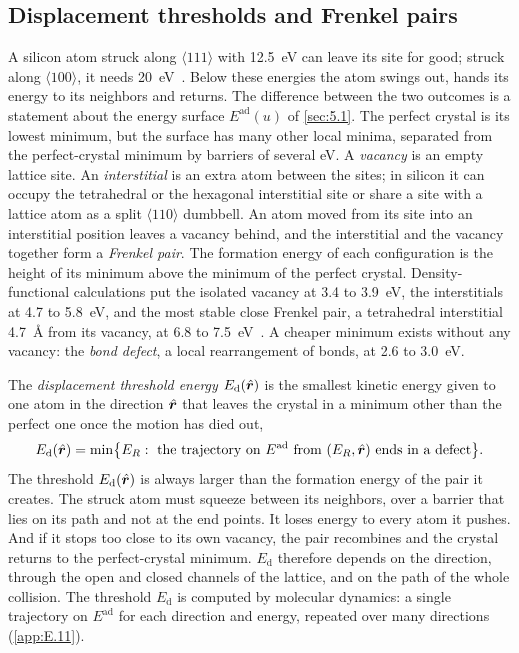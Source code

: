 \subsection{Displacement thresholds and Frenkel pairs}

A silicon atom struck along $\langle111\rangle$ with \SI{12.5}{eV} can leave its site for good; struck along $\langle100\rangle$, it needs \SI{20}{eV}~\cite[Table~IV]{holmstrom2008threshold}. Below these energies the atom swings out, hands its energy to its neighbors and returns. The difference between the two outcomes is a statement about the energy surface $E^{\mathrm{ad}}(u)$ of \cref{sec:5.1}. The perfect crystal is its lowest minimum, but the surface has many other local minima, separated from the perfect-crystal minimum by barriers of several eV. A \emph{vacancy} is an empty lattice site. An \emph{interstitial} is an extra atom between the sites; in silicon it can occupy the tetrahedral or the hexagonal interstitial site or share a site with a lattice atom as a split $\langle110\rangle$ dumbbell. An atom moved from its site into an interstitial position leaves a vacancy behind, and the interstitial and the vacancy together form a \emph{Frenkel pair}. The formation energy of each configuration is the height of its minimum above the minimum of the perfect crystal. Density-functional calculations put the isolated vacancy at 3.4 to \SI{3.9}{eV}, the interstitials at 4.7 to \SI{5.8}{eV}, and the most stable close Frenkel pair, a tetrahedral interstitial \SI{4.7}{\angstrom} from its vacancy, at 6.8 to \SI{7.5}{eV}~\cite[Table~III]{holmstrom2008threshold}. A cheaper minimum exists without any vacancy: the \emph{bond defect}, a local rearrangement of bonds, at 2.6 to \SI{3.0}{eV}.

The \emph{displacement threshold energy} $E_{\mathrm{d}}(\hat{\bm{r}})$ is the smallest kinetic energy given to one atom in the direction $\hat{\bm{r}}$ that leaves the crystal in a minimum other than the perfect one once the motion has died out,
\begin{equation}
  E_{\mathrm{d}}(\hat{\bm{r}}) = \min\bigl\{E_R :\ \text{the trajectory on } E^{\mathrm{ad}} \text{ from } (E_R, \hat{\bm{r}}) \text{ ends in a defect}\bigr\} .
  \label{eq:7.4-Ed}
\end{equation}
The threshold $E_{\mathrm{d}}(\hat{\bm{r}})$ is always larger than the formation energy of the pair it creates. The struck atom must squeeze between its neighbors, over a barrier that lies on its path and not at the end points. It loses energy to every atom it pushes. And if it stops too close to its own vacancy, the pair recombines and the crystal returns to the perfect-crystal minimum. $E_{\mathrm{d}}$ therefore depends on the direction, through the open and closed channels of the lattice, and on the path of the whole collision. The threshold $E_{\mathrm{d}}$ is computed by molecular dynamics: a single trajectory on $E^{\mathrm{ad}}$ for each direction and energy, repeated over many directions (\cref{app:E.11}).

